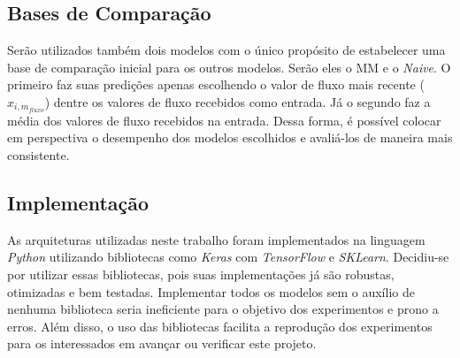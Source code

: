 

\subsection{Bases de Comparação}

Serão utilizados também dois modelos com o único propósito de estabelecer uma base de comparação inicial para os outros modelos. Serão eles o \acrshort{MM} e o \textit{Naive}. O primeiro faz suas predições apenas escolhendo o valor de fluxo mais recente (\(x_{i, m_{fluxo}}\)) dentre os valores de fluxo recebidos como entrada. Já o segundo faz a média dos valores de fluxo recebidos na entrada. Dessa forma, é possível colocar em perspectiva o desempenho dos modelos escolhidos e avaliá-los de maneira mais consistente.

\subsection{Implementação}

As arquiteturas utilizadas neste trabalho foram implementados na linguagem \textit{Python} utilizando bibliotecas como \textit{Keras} com \textit{TensorFlow} e \textit{SKLearn}. Decidiu-se por utilizar essas bibliotecas, pois suas implementações já são robustas, otimizadas e bem testadas. Implementar todos os modelos sem o auxílio de nenhuma biblioteca seria ineficiente para o objetivo dos experimentos e prono a erros. Além disso, o uso das bibliotecas facilita a reprodução dos experimentos para os interessados em avançar ou verificar este projeto.

